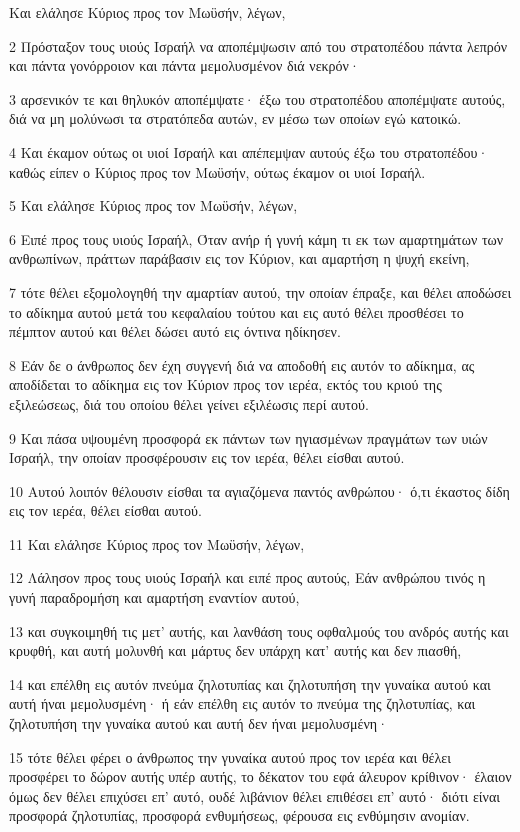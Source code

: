 \par Και ελάλησε Κύριος προς τον Μωϋσήν, λέγων,
\par 2 Πρόσταξον τους υιούς Ισραήλ να αποπέμψωσιν από του στρατοπέδου πάντα λεπρόν και πάντα γονόρροιον και πάντα μεμολυσμένον διά νεκρόν·
\par 3 αρσενικόν τε και θηλυκόν αποπέμψατε· έξω του στρατοπέδου αποπέμψατε αυτούς, διά να μη μολύνωσι τα στρατόπεδα αυτών, εν μέσω των οποίων εγώ κατοικώ.
\par 4 Και έκαμον ούτως οι υιοί Ισραήλ και απέπεμψαν αυτούς έξω του στρατοπέδου· καθώς είπεν ο Κύριος προς τον Μωϋσήν, ούτως έκαμον οι υιοί Ισραήλ.
\par 5 Και ελάλησε Κύριος προς τον Μωϋσήν, λέγων,
\par 6 Ειπέ προς τους υιούς Ισραήλ, Όταν ανήρ ή γυνή κάμη τι εκ των αμαρτημάτων των ανθρωπίνων, πράττων παράβασιν εις τον Κύριον, και αμαρτήση η ψυχή εκείνη,
\par 7 τότε θέλει εξομολογηθή την αμαρτίαν αυτού, την οποίαν έπραξε, και θέλει αποδώσει το αδίκημα αυτού μετά του κεφαλαίου τούτου και εις αυτό θέλει προσθέσει το πέμπτον αυτού και θέλει δώσει αυτό εις όντινα ηδίκησεν.
\par 8 Εάν δε ο άνθρωπος δεν έχη συγγενή διά να αποδοθή εις αυτόν το αδίκημα, ας αποδίδεται το αδίκημα εις τον Κύριον προς τον ιερέα, εκτός του κριού της εξιλεώσεως, διά του οποίου θέλει γείνει εξιλέωσις περί αυτού.
\par 9 Και πάσα υψουμένη προσφορά εκ πάντων των ηγιασμένων πραγμάτων των υιών Ισραήλ, την οποίαν προσφέρουσιν εις τον ιερέα, θέλει είσθαι αυτού.
\par 10 Αυτού λοιπόν θέλουσιν είσθαι τα αγιαζόμενα παντός ανθρώπου· ό,τι έκαστος δίδη εις τον ιερέα, θέλει είσθαι αυτού.
\par 11 Και ελάλησε Κύριος προς τον Μωϋσήν, λέγων,
\par 12 Λάλησον προς τους υιούς Ισραήλ και ειπέ προς αυτούς, Εάν ανθρώπου τινός η γυνή παραδρομήση και αμαρτήση εναντίον αυτού,
\par 13 και συγκοιμηθή τις μετ' αυτής, και λανθάση τους οφθαλμούς του ανδρός αυτής και κρυφθή, και αυτή μολυνθή και μάρτυς δεν υπάρχη κατ' αυτής και δεν πιασθή,
\par 14 και επέλθη εις αυτόν πνεύμα ζηλοτυπίας και ζηλοτυπήση την γυναίκα αυτού και αυτή ήναι μεμολυσμένη· ή εάν επέλθη εις αυτόν το πνεύμα της ζηλοτυπίας, και ζηλοτυπήση την γυναίκα αυτού και αυτή δεν ήναι μεμολυσμένη·
\par 15 τότε θέλει φέρει ο άνθρωπος την γυναίκα αυτού προς τον ιερέα και θέλει προσφέρει το δώρον αυτής υπέρ αυτής, το δέκατον του εφά άλευρον κρίθινον· έλαιον όμως δεν θέλει επιχύσει επ' αυτό, ουδέ λιβάνιον θέλει επιθέσει επ' αυτό· διότι είναι προσφορά ζηλοτυπίας, προσφορά ενθυμήσεως, φέρουσα εις ενθύμησιν ανομίαν.
